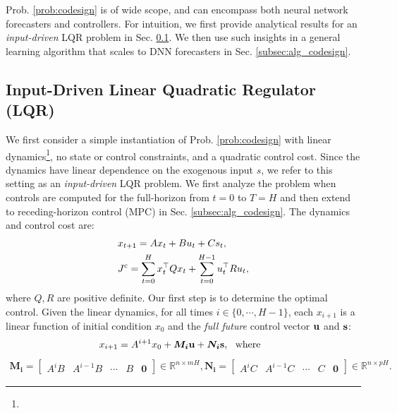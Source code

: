 Prob. \ref{prob:codesign} is of wide scope, and can encompass both neural network forecasters and controllers. For intuition, we first provide analytical results for an \textit{input-driven} LQR problem in Sec. \ref{subsec:input_driven_LQR}. We then use such insights in a general learning algorithm that scales to DNN forecasters in Sec. \ref{subsec:alg_codesign}.

\subsection{Input-Driven Linear Quadratic Regulator (LQR)}
\label{subsec:input_driven_LQR}

We first consider a simple instantiation of Prob. \ref{prob:codesign} with 
linear dynamics\footnote{}, no state or control constraints, and a quadratic control
cost. Since the dynamics have linear dependence on the exogenous input $s$, we
refer to this setting as an \textit{input-driven} LQR problem. We first analyze the problem
when controls are computed for the full-horizon from $t=0$ to $T=H$ and then extend
to receding-horizon control (MPC) in Sec. \ref{subsec:alg_codesign}. The dynamics and control cost are:
\begin{align}
    & x_{t+1} = A x_t + B u_t + C s_t, \\ 
    & J^{\mathrm{c}} = \sum_{t=0}^{H} x_t^\top Q x_t + \sum_{t=0}^{H-1} u_t^\top R u_t, 
    \label{eq:input_driven_LQR} 
\end{align}
where $Q, R$ are positive definite.
Our first step is to determine the optimal control.
Given the linear dynamics, for all times $i \in \{0, \cdots, H-1\}$, each $x_{i+1}$ is a linear function of initial condition $x_0$ and the \textit{full future} control vector $\bold{u}$ and $\bold{s}$:
\begin{align}
x_{i+1} = A^{i+1} x_0 + \bm{M_{i}} \bold{u} + \bm{N_{i}} \bold{s}, ~~\text{where}~~\label{eq:rewrite_x_t}
\end{align}
\begin{align*}
\bm{M_{i}} = \begin{bmatrix}
A^{i}B & A^{i-1}B & \cdots & B & \bm{0}
\end{bmatrix} \in \mathbb{R}^{n \times mH}, \bm{N_{i}} = \begin{bmatrix}
    A^{i}C & A^{i-1}C & \cdots & C & \bm{0}
\end{bmatrix} \in \mathbb{R}^{n \times pH}.
\end{align*}

